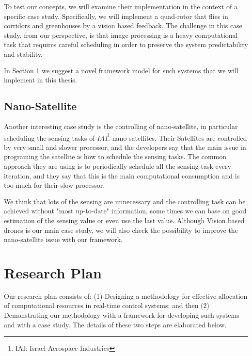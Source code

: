\documentclass[11pt]{article}
\begin{document}
To test our concepts, we will examine their implementation in the context of a specific case study. Specifically, we will implement a quad-rotor that flies in corridors and greenhouses by a vision based feedback. The challenge in this case study, from our perspective, is that image processing is a heavy computational task that requires careful scheduling in order to preserve the system predictability and stability.

In Section \ref{sec:Research Plan} we suggest a novel framework model for such systems that we will implement in this thesis.

\subsection{Nano-Satellite}
Another interesting case study is the controlling of nano-satellite, in particular scheduling the sensing tasks of \textit{IAI}\footnote{IAI: Israel Aerospace Industries} nano satellites. Their Satellites are controlled by very small and slower processor, and the developers say that the main issue in programing the satellite is how to schedule the sensing tasks.
The common approach they are using is to periodically schedule all the sensing task every iteration, and they say that this is the main computational consumption and is too much for their slow processor.

We think that lots of the sensing are unnecessary and the controlling task can be achieved without "most up-to-date" information, some times we can base on good estimation of the sensing value or even use the last value. Although Vision based drones is our main case study, we will also check the possibility to improve the nano-satellite issue with our framework.

\section{Research Plan}
\label{sec:Research Plan}

Our research plan consists of: (1) Designing a methodology for effective allocation of computational resources in real-time control systems; and then (2) Demonstrating our methodology with a framework for developing such systems and with a case study. The details of these two steps are elaborated below.
\end{document}
